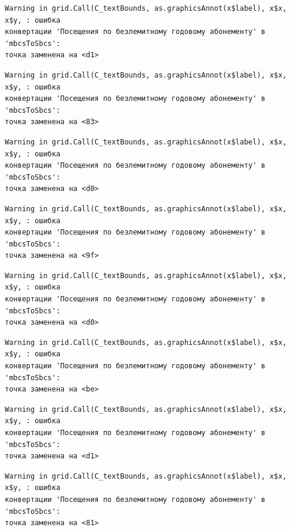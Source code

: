 \documentclass[
  letterpaper,
  DIV=11,
  numbers=noendperiod]{scrreprt}
\begin{document}
\begin{verbatim}
Warning in grid.Call(C_textBounds, as.graphicsAnnot(x$label), x$x, x$y, : ошибка
конвертации 'Посещения по безлемитному годовому абонементу' в 'mbcsToSbcs':
точка заменена на <d1>
\end{verbatim}

\begin{verbatim}
Warning in grid.Call(C_textBounds, as.graphicsAnnot(x$label), x$x, x$y, : ошибка
конвертации 'Посещения по безлемитному годовому абонементу' в 'mbcsToSbcs':
точка заменена на <83>
\end{verbatim}

\begin{verbatim}
Warning in grid.Call(C_textBounds, as.graphicsAnnot(x$label), x$x, x$y, : ошибка
конвертации 'Посещения по безлемитному годовому абонементу' в 'mbcsToSbcs':
точка заменена на <d0>
\end{verbatim}

\begin{verbatim}
Warning in grid.Call(C_textBounds, as.graphicsAnnot(x$label), x$x, x$y, : ошибка
конвертации 'Посещения по безлемитному годовому абонементу' в 'mbcsToSbcs':
точка заменена на <9f>
\end{verbatim}

\begin{verbatim}
Warning in grid.Call(C_textBounds, as.graphicsAnnot(x$label), x$x, x$y, : ошибка
конвертации 'Посещения по безлемитному годовому абонементу' в 'mbcsToSbcs':
точка заменена на <d0>
\end{verbatim}

\begin{verbatim}
Warning in grid.Call(C_textBounds, as.graphicsAnnot(x$label), x$x, x$y, : ошибка
конвертации 'Посещения по безлемитному годовому абонементу' в 'mbcsToSbcs':
точка заменена на <be>
\end{verbatim}

\begin{verbatim}
Warning in grid.Call(C_textBounds, as.graphicsAnnot(x$label), x$x, x$y, : ошибка
конвертации 'Посещения по безлемитному годовому абонементу' в 'mbcsToSbcs':
точка заменена на <d1>
\end{verbatim}

\begin{verbatim}
Warning in grid.Call(C_textBounds, as.graphicsAnnot(x$label), x$x, x$y, : ошибка
конвертации 'Посещения по безлемитному годовому абонементу' в 'mbcsToSbcs':
точка заменена на <81>
\end{verbatim}
\end{document}
